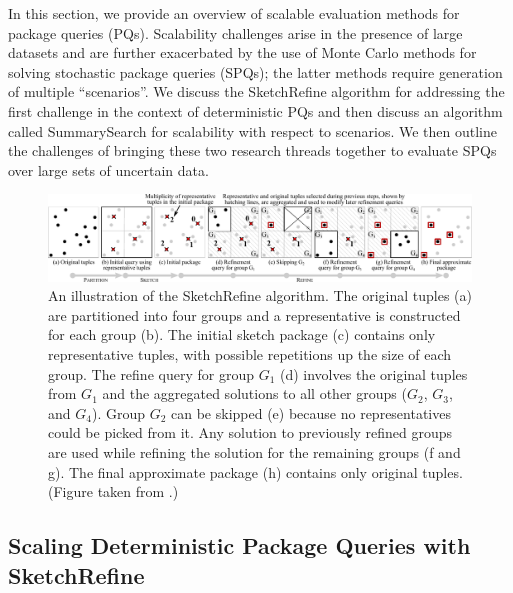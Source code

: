 \documentclass[11pt]{article}
\newcommand{\skref}{{\sc SketchRefine}\xspace}
\newcommand{\subsearch}{{\sc SummarySearch}\xspace}
\begin{document}
    
   
In this section, we provide an overview of scalable evaluation methods for
package queries (PQs). Scalability challenges arise in the presence of large
datasets and are further exacerbated by the use of Monte Carlo methods for
solving stochastic package queries (SPQs); the latter methods require
generation of multiple ``scenarios''. We discuss the \skref algorithm for
addressing the first challenge in the context of deterministic PQs and then
discuss an algorithm called \subsearch for scalability with respect to
scenarios. We then outline the challenges of bringing these two research
threads together to evaluate SPQs over large sets of uncertain data.
   
      \begin{figure}[t!]
    \centering
    \includegraphics[width=1\textwidth]{figs/explain4.pdf}
    \caption{An illustration of the \skref algorithm. The original tuples (a) are partitioned into four groups and a representative is constructed for each group (b). The initial sketch package (c) contains only representative tuples, with possible repetitions up the size of each group. The refine query for group $G_1$ (d) involves the original tuples from $G_1$ and the aggregated solutions to all other groups ($G_2$, $G_3$, and $G_4$). Group $G_2$ can be skipped (e) because no representatives could be picked from it. Any solution to previously refined groups are used while refining the solution for the remaining groups (f and g). The final approximate package (h) contains only original tuples. (Figure taken from \cite{BrucatoBAM16}.)}
    \label{fig:sketchrefine}
\end{figure}

   \subsection{Scaling Deterministic Package Queries with SketchRefine}
   \label{sec:pql}
\end{document}

